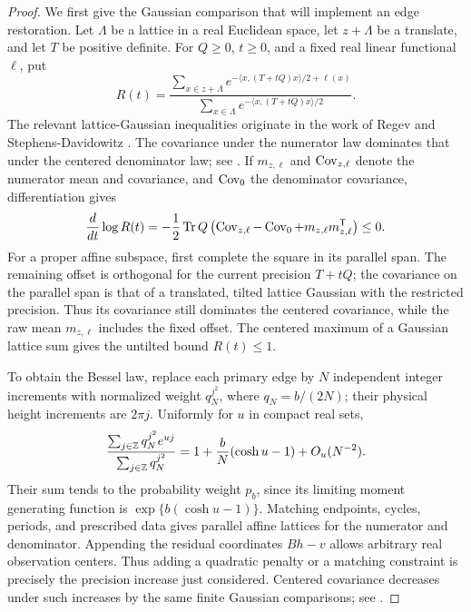 \begin{proof}
We first give the Gaussian comparison that will implement an edge
restoration. Let \(\Lambda\) be a lattice in a real Euclidean space,
let \(z+\Lambda\) be a translate, and let \(T\) be positive definite.
For \(Q\ge0\), \(t\ge0\), and a fixed real linear functional \(\ell\),
put
\[
 R(t)=
 \frac{\displaystyle\sum_{x\in z+\Lambda}
     e^{-\langle x,(T+tQ)x\rangle/2+\ell(x)}}
      {\displaystyle\sum_{x\in\Lambda}
     e^{-\langle x,(T+tQ)x\rangle/2}}.
\]
The relevant lattice-Gaussian inequalities originate in the work of
Regev and Stephens-Davidowitz \cite[Theorem~2.1 and Corollary~3.2]{RSD}.
The covariance under the numerator law dominates that under the
centered denominator law; see \cite[Lemma~2.1]{B}. If \(m_{z,\ell}\)
and \(\operatorname{Cov}_{z,\ell}\) denote the numerator mean and covariance,
and \(\operatorname{Cov}_0\) the denominator covariance, differentiation gives
\[
       \frac{d}{dt}\log R(t)
       =-\frac12\operatorname{Tr} Q\left(
          \operatorname{Cov}_{z,\ell}-\operatorname{Cov}_0+
          m_{z,\ell}m_{z,\ell}^{\mathsf T}\right)\le0.
\]
For a proper affine subspace, first complete the square in its
parallel span. The remaining offset is orthogonal for the current
precision \(T+tQ\); the covariance on the parallel span is that of a
translated, tilted lattice Gaussian with the restricted precision.
Thus its covariance still dominates the centered covariance, while
the raw mean \(m_{z,\ell}\) includes the fixed offset.
The centered maximum of a Gaussian lattice sum gives the untilted
bound \(R(t)\le1\).

To obtain the Bessel law, replace each primary edge by \(N\)
independent integer increments with normalized weight \(q_N^{j^2}\),
where \(q_N=b/(2N)\); their physical height increments are \(2\pi j\).
Uniformly for \(u\) in compact real sets,
\[
 \frac{\sum_{j\in\mathbb Z}q_N^{j^2}e^{uj}}{\sum_{j\in\mathbb Z}q_N^{j^2}}
   =1+\frac bN(\cosh u-1)+O_u(N^{-2}).
\]
Their sum tends to the probability weight \(p_b\), since its limiting
moment generating function is \(\exp\{b(\cosh u-1)\}\).
Matching endpoints, cycles, periods, and prescribed data gives
parallel affine lattices for the numerator and denominator.
Appending the residual coordinates \(Bh-v\) allows arbitrary real
observation centers. Thus adding a quadratic penalty or a matching
constraint is precisely the precision increase just considered.
Centered covariance decreases under such increases by the same
finite Gaussian comparisons; see \cite[Lemma~2.1]{B}.


\end{proof}
